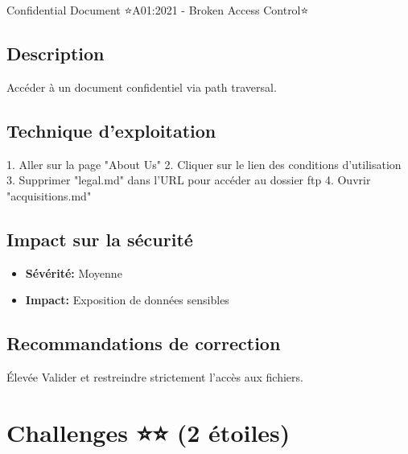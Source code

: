 \begin{vulnerability}{Confidential Document ⭐}{A01:2021 - Broken Access Control}{⭐}
    \subsection*{Description}
    Accéder à un document confidentiel via path traversal.
    
    \subsection*{Technique d'exploitation}
    1. Aller sur la page "About Us"
    2. Cliquer sur le lien des conditions d'utilisation
    3. Supprimer "legal.md" dans l'URL pour accéder au dossier ftp
    4. Ouvrir "acquisitions.md"
    
    \subsection*{Impact sur la sécurité}
    \begin{itemize}
        \item \textbf{Sévérité:} Moyenne
        \item \textbf{Impact:} Exposition de données sensibles
    \end{itemize}
    
    \subsection*{Recommandations de correction}
    \begin{recommendation}{Élevée}
        Valider et restreindre strictement l'accès aux fichiers.
    \end{recommendation}
\end{vulnerability}

\section{Challenges ⭐⭐ (2 étoiles)}

